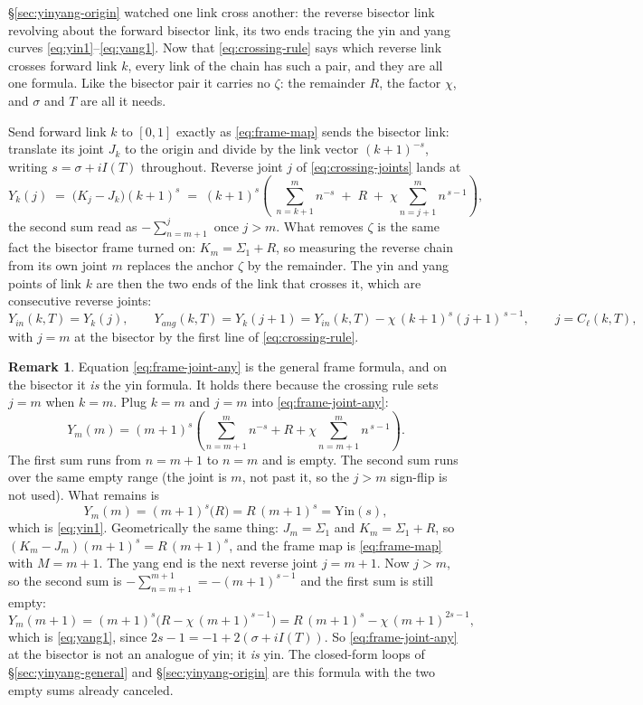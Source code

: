 \documentclass[11pt]{article}
\theoremstyle{definition}
\newtheorem{remark}[theorem]{Remark}
\begin{document}
\S\ref{sec:yinyang-origin} watched one link cross another: the reverse bisector link
revolving about the forward bisector link, its two ends tracing the yin and
yang curves \eqref{eq:yin1}--\eqref{eq:yang1}. Now that \eqref{eq:crossing-rule}
says which reverse link crosses forward link $k$, every link of the chain has
such a pair, and they are all one formula. Like the bisector pair it carries no
$\zeta$: the remainder $R$, the factor $\chi$, and $\sigma$ and $T$ are all it
needs.

Send forward link $k$ to $[0,1]$ exactly as \eqref{eq:frame-map} sends the
bisector link: translate its joint $J_k$ to the origin and divide by the link
vector $(k+1)^{-s}$, writing $s=\sigma+iI(T)$ throughout. Reverse joint $j$ of
\eqref{eq:crossing-joints} lands at
\begin{equation}\label{eq:frame-joint-any}
Y_k(j)\;=\;\bigl(K_j-J_k\bigr)(k+1)^{s}
\;=\;(k+1)^{s}\left(\;\sum_{n=k+1}^{m}n^{-s}\;+\;R\;+\;\chi\!\!\sum_{n=j+1}^{m}\!\!n^{\,s-1}\right),
\end{equation}
the second sum read as $-\sum_{n=m+1}^{j}$ once $j>m$. What removes $\zeta$ is
the same fact the bisector frame turned on: $K_m=\Sigma_1+R$, so measuring the
reverse chain from its own joint $m$ replaces the anchor $\zeta$ by the
remainder. The yin and yang points of link $k$ are then the two ends of the
link that crosses it, which are consecutive reverse joints:
\begin{equation}\label{eq:yin-any}
Y_{in}(k,T)=Y_k(j),
\qquad
Y_{ang}(k,T)=Y_k(j+1)=Y_{in}(k,T)-\chi\,(k+1)^{s}(j+1)^{\,s-1},
\qquad j=C_{\ell}(k,T),
\end{equation}
with $j=m$ at the bisector by the first line of \eqref{eq:crossing-rule}.

\begin{remark}
Equation \eqref{eq:frame-joint-any} is the general frame formula, and on the
bisector it \emph{is} the yin formula. It holds there because the crossing
rule sets $j=m$ when $k=m$. Plug $k=m$ and $j=m$ into
\eqref{eq:frame-joint-any}:
\[
Y_m(m)=(m+1)^{s}\left(\sum_{n=m+1}^{m}n^{-s}+R+\chi\sum_{n=m+1}^{m}n^{\,s-1}\right).
\]
The first sum runs from $n=m+1$ to $n=m$ and is empty. The second sum runs
over the same empty range (the joint is $m$, not past it, so the $j>m$
sign-flip is not used). What remains is
\[
Y_m(m)=(m+1)^{s}\bigl(R\bigr)=R\,(m+1)^{s}=\mathrm{Yin}(s),
\]
which is \eqref{eq:yin1}. Geometrically the same thing: $J_m=\Sigma_1$ and
$K_m=\Sigma_1+R$, so
$(K_m-J_m)(m+1)^{s}=R\,(m+1)^{s}$, and the frame map is
\eqref{eq:frame-map} with $M=m+1$. The yang end is the next
reverse joint $j=m+1$. Now $j>m$, so the second sum is
$-\sum_{n=m+1}^{m+1}=-(m+1)^{s-1}$ and the first sum is still empty:
\[
Y_m(m+1)=(m+1)^{s}\bigl(R-\chi\,(m+1)^{s-1}\bigr)
=R\,(m+1)^{s}-\chi\,(m+1)^{2s-1},
\]
which is \eqref{eq:yang1}, since $2s-1=-1+2(\sigma+iI(T))$. So
\eqref{eq:frame-joint-any} at the bisector is not an analogue of yin; it
\emph{is} yin. The closed-form loops of \S\ref{sec:yinyang-general} and
\S\ref{sec:yinyang-origin} are this formula
with the two empty sums already canceled.
\end{remark}
\end{document}
